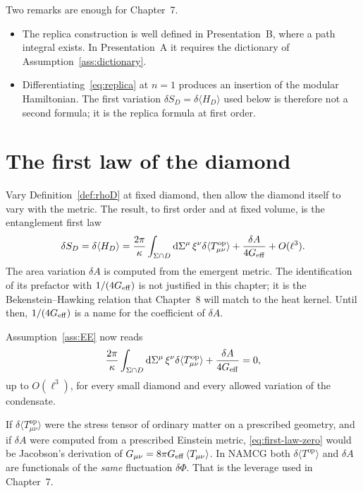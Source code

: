 Two remarks are enough for Chapter~7.

\begin{itemize}
  \item The replica construction is well defined in Presentation~B,
        where a path integral exists. In Presentation~A it requires
        the dictionary of Assumption~\ref{ass:dictionary}.
  \item Differentiating~\eqref{eq:replica} at \(n=1\) produces an
        insertion of the modular Hamiltonian. The first variation
        \(\delta S_D=\delta\langle H_D\rangle\) used below is therefore
        not a second formula; it is the replica formula at first
        order.
\end{itemize}

\section{The first law of the diamond}
\label{sec:ch6-first-law}

Vary Definition~\ref{def:rhoD} at fixed diamond, then allow the
diamond itself to vary with the metric. The result, to first order
and at fixed volume, is the entanglement first law
\begin{equation}
  \label{eq:first-law}
  \delta S_D
  =\delta\langle H_D\rangle
  =\frac{2\pi}{\kappa}
   \int_{\Sigma\cap D}
   \mathrm{d}\Sigma^\mu\,\xi^\nu
   \delta\langle T_{\mu\nu}^{\mathrm{op}}\rangle
   +\frac{\delta A}{4G_{\mathrm{eff}}}
   +O(\ell^3).
\end{equation}
The area variation \(\delta A\) is computed from the emergent metric.
The identification of its prefactor with \(1/(4G_{\mathrm{eff}})\) is not
justified in this chapter; it is the Bekenstein--Hawking relation
that Chapter~8 will match to the heat kernel. Until then,
\(1/(4G_{\mathrm{eff}})\) is a name for the coefficient of \(\delta A\).

Assumption~\ref{ass:EE} now reads
\begin{equation}
  \label{eq:first-law-zero}
  \frac{2\pi}{\kappa}
   \int_{\Sigma\cap D}
   \mathrm{d}\Sigma^\mu\,\xi^\nu
   \delta\langle T_{\mu\nu}^{\mathrm{op}}\rangle
   +\frac{\delta A}{4G_{\mathrm{eff}}}
  =0,
\end{equation}
up to \(O(\ell^3)\), for every small diamond and every allowed
variation of the condensate.

If \(\delta\langle T_{\mu\nu}^{\mathrm{op}}\rangle\) were the
stress tensor of ordinary matter on a prescribed geometry, and if
\(\delta A\) were computed from a prescribed Einstein metric,
\eqref{eq:first-law-zero} would be Jacobson's derivation of
\(G_{\mu\nu}=8\pi G_{\mathrm{eff}}\,\langle T_{\mu\nu}\rangle\). In NAMCG both
\(\delta\langle T^{\mathrm{op}}\rangle\) and \(\delta A\) are
functionals of the \emph{same} fluctuation \(\delta\Phi\). That is
the leverage used in Chapter~7.

